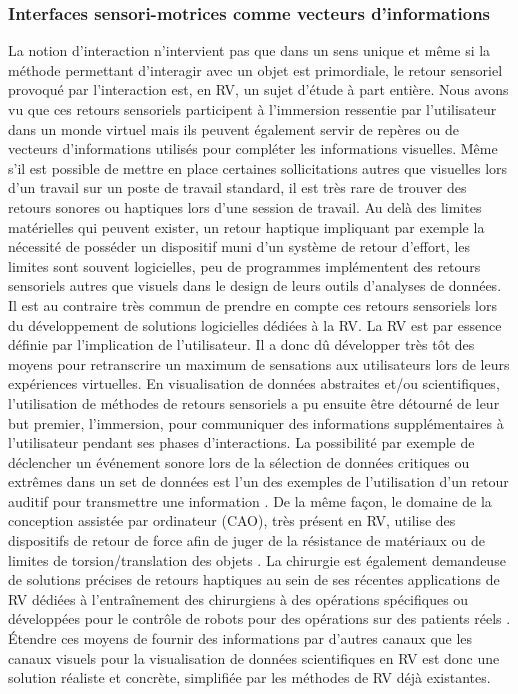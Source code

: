 \subsubsection{Interfaces sensori-motrices comme vecteurs d'informations}

La notion d'interaction n'intervient pas que dans un sens unique et même si la méthode permettant d'interagir avec un objet est primordiale, le retour sensoriel provoqué par l'interaction est, en RV, un sujet d'étude à part entière. Nous avons vu que ces retours sensoriels participent à l'immersion ressentie par l'utilisateur dans un monde virtuel mais ils peuvent également servir de repères ou de vecteurs d'informations utilisés pour compléter les informations visuelles. Même s'il est possible de mettre en place certaines sollicitations autres que visuelles lors d'un travail sur un poste de travail standard, il est très rare de trouver des retours sonores ou haptiques lors d'une session de travail. Au delà des limites matérielles qui peuvent exister, un retour haptique impliquant par exemple la nécessité de posséder un dispositif muni d'un système de retour d'effort, les limites sont souvent logicielles, peu de programmes implémentent des retours sensoriels autres que visuels dans le design de leurs outils d'analyses de données. Il est au contraire très commun de prendre en compte ces retours sensoriels lors du développement de solutions logicielles dédiées à la RV. La RV est par essence définie par l'implication de l'utilisateur. Il a donc dû développer très tôt des moyens pour retranscrire un maximum de sensations aux utilisateurs lors de leurs expériences virtuelles. En visualisation de données abstraites et/ou scientifiques, l'utilisation de méthodes de retours sensoriels a pu ensuite être détourné de leur but premier, l'immersion, pour communiquer des informations supplémentaires à l'utilisateur pendant ses phases d'interactions. La possibilité par exemple de déclencher un événement sonore lors de la sélection de données critiques ou extrêmes dans un set de données est l'un des exemples de l'utilisation d'un retour auditif pour transmettre une information \cite{ferey_multisensory_2009}. De la même façon, le domaine de la conception assistée par ordinateur (CAO), très présent en RV, utilise des dispositifs de retour de force afin de juger de la résistance de matériaux ou de limites de torsion/translation des objets \cite{sun2010haptic}. La chirurgie est également demandeuse de solutions précises de retours haptiques au sein de ses récentes applications de RV dédiées à l’entraînement des chirurgiens à des opérations spécifiques ou développées pour le contrôle de robots pour des opérations sur des patients réels \cite{kusumoto_application_2006}. Étendre ces moyens de fournir des informations par d'autres canaux que les canaux visuels pour la visualisation de données scientifiques en RV est donc une solution réaliste et concrète, simplifiée par les méthodes de RV déjà existantes.


